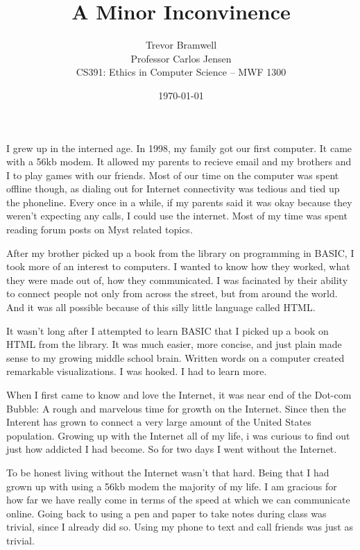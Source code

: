 \documentclass[12pt,letterpaper]{article}
\title{A Minor Inconvinence}
\author{
    Trevor Bramwell\\
    Professor Carlos Jensen\\
    CS391: Ethics in Computer Science -- MWF 1300\\
}
\date{\today}
\begin{document}
\maketitle

I grew up in the interned age. In 1998, my family got our first
computer. It came with a 56kb modem. It allowed my parents to recieve
email and my brothers and I to play games with our friends. Most of our
time on the computer was spent offline though, as dialing out for
Internet connectivity was tedious and tied up the phoneline. Every once
in a while, if my parents said it was okay because they weren't
expecting any calls, I could use the internet. Most of my time was spent
reading forum posts on Myst related topics.

After my brother picked up a book from the library on programming in
BASIC, I took more of an interest to computers. I wanted to know how
they worked, what they were made out of, how they communicated. I was
facinated by their ability to connect people not only from across the
street, but from around the world. And it was all possible because of
this silly little language called HTML. 

It wasn't long after I attempted to learn BASIC that I picked up a book
on HTML from the library. It was much easier, more concise, and just
plain made sense to my growing middle school brain. Written words on a
computer created remarkable visualizations. I was hooked. I had to learn
more.

When I first came to know and love the Internet, it was near end of the
Dot-com Bubble: A rough and marvelous time for growth on the Internet.
Since then the Interent has grown to connect a very large amount of the
United States population. Growing up with the Internet all of my life, i
was curious to find out just how addicted I had become. So for two days
I went without the Internet. 

To be honest living without the Internet wasn't that hard. Being that I
had grown up with using a 56kb modem the majority of my life. I am
gracious for how far we have really come in terms of the speed at which
we can communicate online. Going back to using a pen and paper to take
notes during class was trivial, since I already did so. Using my phone
to text and call friends was just as trivial.
\end{document}
